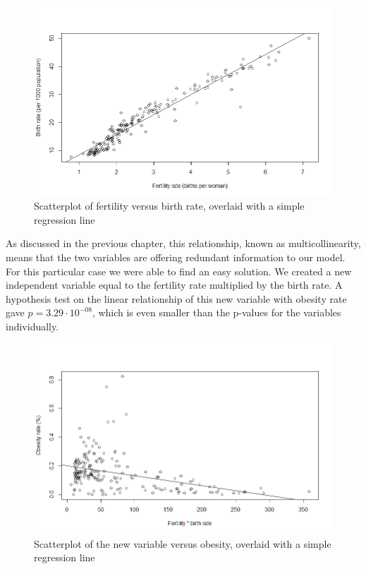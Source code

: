 \documentclass[oneside,12pt]{report}
\begin{document}
\begin{figure}
\centering
\caption{Scatterplot of fertility versus birth rate, overlaid with a simple regression line}
\label{fig:fertility-birth_rate}
\includegraphics[width=\textwidth]{fertility-birth_rate.png}
\end{figure}

As discussed in the previous chapter, this relationship, known as multicollinearity, means that the two variables are offering redundant information to our model. For this particular case we were able to find an easy solution. We created a new independent variable equal to the fertility rate multiplied by the birth rate. A hypothesis test on the linear relationship of this new variable with obesity rate gave \begin{math}p=3.29\cdot10^{-08}\end{math}, which is even smaller than the p-values for the variables individually.

\begin{figure}
\centering
\caption{Scatterplot of the new variable versus obesity, overlaid with a simple regression line}
\label{fig:fertility.birth_rate}
\includegraphics[width=\textwidth]{fertility-birth_rate-obesity-scatter.png}
\end{figure}
\end{document}
